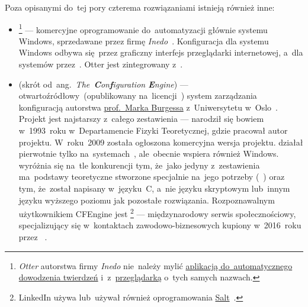 \documentclass[thesis]{subfiles}
\begin{document}
Poza opisanymi do~tej pory czterema rozwiązaniami istnieją również inne:\mynobreakpar
\begin{itemize}
	\item {}\footnote{\emph{Otter} autorstwa firmy \emph{Inedo} nie~należy mylić \href{https://en.wikipedia.org/wiki/Prover9\#Predecessor}{aplikacją do~automatycznego dowodzenia twierdzeń} i~z~\href{https://pl.wikipedia.org/wiki/Otter\_Browser}{przeglądarką} o~tych samych nazwach.} --- komercyjne oprogramowanie do~automatyzacji głównie systemu Windows, sprzedawane przez firmę \emph{Inedo}~\cite{otter}. Konfiguracja dla systemu Windows odbywa się~przez graficzny interfejs przeglądarki internetowej, a~dla systemów  przez~\ssh{}. Otter jest zintegrowany z~.
	\item\label{itm:cfengine} \emph{\cfengine{}} (skrót od~ang.~\emph{The~\textbf{C}on\textbf{f}iguration \textbf{E}ngine}) --- otwartoźródłowy~(opublikowany na~licencji~) system zarządzania konfiguracją autorstwa \href{https://en.wikipedia.org/wiki/Mark_Burgess_(computer_scientist)}{prof.~Marka Burgessa} z~Uniwersytetu w~Oslo~\cite{cfengine}. Projekt jest najstarszy z~całego zestawienia --- narodził się bowiem w~1993~roku w~Departamencie Fizyki Teoretycznej, gdzie pracował autor projektu. W~roku~2009 została ogłoszona komercyjna wersja projektu. \cfengine{} działał pierwotnie tylko na~systemach~, ale~obecnie wspiera również Windows. \cfengine{} wyróżnia się na~tle konkurencji tym, że~jako jedyny z~zestawienia ma~podstawy teoretyczne stworzone specjalnie na~jego potrzeby (~\cite{cfengine-whitepaper,mark-burgess-webpage}) oraz tym, że~został napisany w~języku~C, a~nie języku skryptowym lub~innym języku wyższego poziomu jak pozostałe rozwiązania. Rozpoznawalnym użytkownikiem CFEngine jest \footnote{LinkedIn używa lub~używał również oprogramowania \hyperref[sec:salt]{Salt}~\cite{salt-linkedin}.} --- międzynarodowy serwis społecznościowy, specjalizujący się w~kontaktach zawodowo-biznesowych kupiony w~2016~roku przez ~\cite{cfengine-linkedin}.

\end{itemize}
\end{document}
